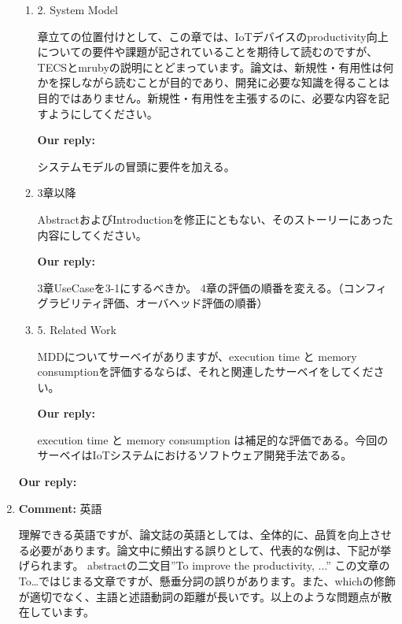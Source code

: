 \documentclass{article}
\begin{document}
\begin{enumerate}
\begin{flushleft}
\begin{enumerate}
\item 2. System Model

章立ての位置付けとして、この章では、IoTデバイスのproductivity向上についての要件や課題が記されていることを期待して読むのですが、TECSとmrubyの説明にとどまっています。論文は、新規性・有用性は何かを探しながら読むことが目的であり、開発に必要な知識を得ることは目的ではありません。新規性・有用性を主張するのに、必要な内容を記すようにしてください。

\begin{flushleft}
\textbf{Our reply:}

システムモデルの冒頭に要件を加える。
\end{flushleft}

\item 3章以降

AbstractおよびIntroductionを修正にともない、そのストーリーにあった内容にしてください。

\begin{flushleft}
\textbf{Our reply:}

3章UseCaseを3-1にするべきか。
4章の評価の順番を変える。（コンフィグラビリティ評価、オーバヘッド評価の順番）
\end{flushleft}

\item 5. Related Work

MDDについてサーベイがありますが、execution time と memory consumptionを評価するならば、それと関連したサーベイをしてください。

\begin{flushleft}
\textbf{Our reply:}

execution time と memory consumption は補足的な評価である。今回のサーベイはIoTシステムにおけるソフトウェア開発手法である。
\end{flushleft}

\end{enumerate}
\end{flushleft}


\begin{flushleft}
\textbf{Our reply:}
\end{flushleft}


\item \begin{flushleft}
\textbf{Comment:} 英語

理解できる英語ですが、論文誌の英語としては、全体的に、品質を向上させる必要があります。論文中に頻出する誤りとして、代表的な例は、下記が挙げられます。
abstractの二文目”To improve the productivity, ...”
この文章のTo…ではじまる文章ですが、懸垂分詞の誤りがあります。また、whichの修飾が適切でなく、主語と述語動詞の距離が長いです。以上のような問題点が散在しています。
\end{flushleft}


\end{enumerate}
\end{document}
